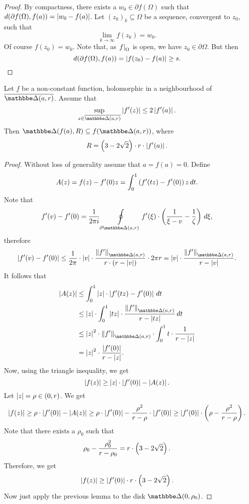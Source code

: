 \begin{proof}
By compactness, there exists a $w_0 \in \partial f(\Omega)$ such
that $d(\partial f(\Omega), f(a)) = \left\lvert w_0 - f(a)\right\rvert$. Let
$(z_k)_k \subseteq \Omega$ be a sequence, convergent to $z_0$, such
that
\[
\lim_{k \to \infty} f(z_k) = w_0.
\]
Of course $f(z_0) = w_0$. Note that, as $\left. f\right|_{\Omega}^{}$ is
open, we have $z_0 \in \partial \Omega$. But then
\[
d(\partial f(\Omega), f(a)) = \left\lvert f(z_0) - f(a)\right\rvert \geq s. \qedhere
\]
\end{proof}

\begin{lema}
\label{thm_hol:lm:bloch}
Let $f$ be a non-constant function, holomorphic in a neighbourhood
of $\oline{\dsk(a, r)}$. Assume that
\[
\sup_{z \in \oline{\dsk(a,r)}} \abs{f'(z)} \leq 2 \abs{f'(a)}.
\]
Then $\dsk(f(a), R) \subseteq f(\dsk(a, r))$, where
\[
R = \left(3 - 2 \sqrt{2}\right) \cdot r \cdot \left\lvert f'(a)\right\rvert.
\]
\end{lema}

\begin{proof}
Without loss of generality assume that $a = f(a) = 0$. Define
\[
A(z) = f(z) - f'(0) z = \int_0^1 \left(f'(tz) - f'(0)\right) z \,dt.
\]
Note that
\[
f'(v) - f'(0) =
\frac{1}{2 \pi i} \olint_{\partial \dsk(a, r)}
f'(\xi) \cdot \br{\frac{1}{\xi-v} - \frac{1}{\zeta}}\,d\xi,
\]
therefore
\[
\abs{f'(v) - f'(0)} \leq
\frac{1}{2 \pi} \cdot \abs{v} \cdot
\frac{\norm{f'}_{\dsk(a,r)}}{r \cdot (r - \abs{v})} \cdot 2 \pi r =
\abs{v} \cdot \frac{\norm{f'}_{\dsk(a,r)}}{r - \abs{v}}.
\]
It follows that
\begin{align*}
\abs{A(z)} &\leq
\int_0^1 \abs{z} \cdot \abs{f'(tz) - f'(0)}\,dt
\\
&\leq
\abs{z} \cdot \int_0^1
\abs{tz} \cdot \frac{\norm{f'}_{\dsk(a,r)}}{r - \abs{tz}}\,dt
\\
&\leq
\abs{z}^2 \cdot \norm{f'}_{\dsk(a,r)} \cdot \int_0^1
t \cdot \frac{1}{r - \abs{z}}
\\
&=
\abs{z}^2 \cdot
\frac{\abs{f'(0)}}{r - \abs{z}}.
\end{align*}
Now, using the triangle inequality, we get
\[
\left\lvert f(z)\right\rvert \geq \left\lvert z\right\rvert \cdot \left\lvert f'(0)\right\rvert - \left\lvert A(z)\right\rvert.
\]
Let $\left\lvert z\right\rvert = \rho \in (0, r)$. We get
\[
\left\lvert f(z)\right\rvert \geq
\rho \cdot \left\lvert f'(0)\right\rvert - \left\lvert A(z)\right\rvert \geq
\rho \cdot \left\lvert f'(0)\right\rvert -
\frac{\rho^2}{r - \rho} \cdot \left\lvert f'(0)\right\rvert \geq
\left\lvert f'(0)\right\rvert \cdot \left(\rho - \frac{\rho^2}{r - \rho}\right).
\]
Note that there exists a $\rho_0$ such that
\[
\rho_0 - \frac{\rho_0^2}{r - \rho_0} =
r \cdot \left(3 - 2 \sqrt{2}\right).
\]
Therefore, we get
\[
\left\lvert f(z)\right\rvert \geq \left\lvert f'(0)\right\rvert \cdot r \cdot \left(3 - 2 \sqrt{2}\right).
\]
Now just apply the previous lemma to the disk $\dsk(0, \rho_0)$.
\end{proof}

